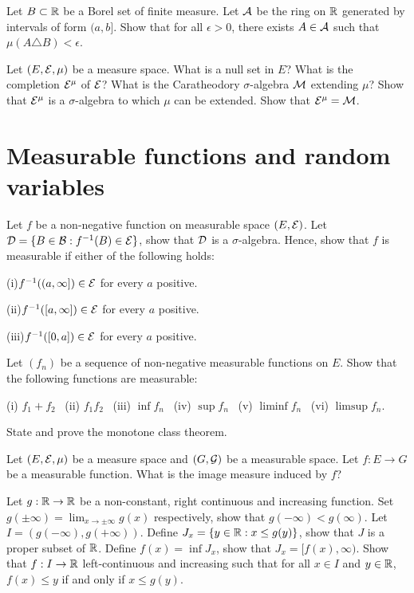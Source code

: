 \begin{question}{1.1}
	Let $B \subset \mathbb{R}$ be a Borel set of finite measure. Let $\mathcal{A}$ be the ring on $\mathbb{R}$ generated by intervals of form $(a,b]$. Show that for all $\epsilon > 0$, there exists $A \in \mathcal{A}$ such that $\mu(A \triangle B) < \epsilon$.
\end{question}

\begin{question}{1.2}
Let $(E,\mathcal{E},\mu)$ be a measure space. What is a null set in $E$? What is the completion $\mathcal{E}^\mu$ of $\mathcal{E}$? What is the Caratheodory $\sigma$-algebra $\mathcal{M}$ extending $\mu$? Show that $\mathcal{E}^\mu$ is a $\sigma$-algebra to which $\mu$ can be extended. Show that $\mathcal{E}^\mu = \mathcal{M}$.
\end{question}
\section{Measurable functions and random variables}
\begin{question}{6}
Let $f$ be a non-negative function on measurable space $(E,\mathcal{E})$.  Let $\mathcal{D} = \{B \in \mathcal{B}: f^{-1}(B) \in \mathcal{E}\}$, show that $\mathcal{D}$ is a $\sigma$-algebra.
Hence, show that $f$ is measurable if either of the following holds:

(i)$f^{-1}((a,\infty]) \in \mathcal{E}$ for every $a$ positive.

(ii)$f^{-1}([a,\infty]) \in \mathcal{E}$ for every $a$ positive. 

(iii)$f^{-1}([0,a]) \in \mathcal{E}$ for every $a$ positive. 
\bigskip

Let $(f_n)$ be a sequence of non-negative measurable functions on $E$. Show that the following functions are measurable:

(i) $f_1 +f_2$ \,
(ii) $f_1 f_2$ \,
(iii) $\inf f_n$ \,
(iv) $\sup f_n$ \,
(v) $\liminf f_n$ \,
(vi) $\limsup f_n$.
\end{question}

\begin{question}{7}
State and prove the monotone class theorem.
\end{question}

\begin{question}{8}
Let $(E,\mathcal{E},\mu)$ be a measure space and $(G, \mathcal{G})$ be a measurable space. Let $f:E\rightarrow G$ be a measurable function. What is the image measure induced by $f$?

Let $g : \mathbb{R} \rightarrow \mathbb{R}$ be a non-constant, right continuous and increasing function. Set $g(\pm \infty) = \lim_{x\rightarrow \pm \infty} g(x)$ respectively, show that $g(-\infty) < g(\infty)$. Let $I = (g(-\infty),g(+ \infty))$. Define $J_x = \{y \in \mathbb{R} : x \leq g(y)\}$, show that $J$ is a proper subset of $\mathbb{R}$.  Define $f(x) = \inf J_x$, show that $J_x = [f(x),\infty)$. Show that $f: I \rightarrow \mathbb{R}$ left-continuous and increasing such that for all $x \in I$ and $y \in \mathbb{R}$, $f(x) \leq y$ if and only if $x \leq g(y)$.
\end{question}

